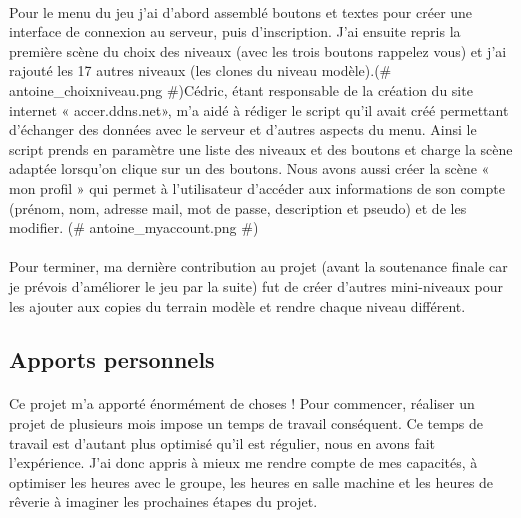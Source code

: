 \documentclass[titlepage, 13px, a4paper]{report}
\begin{document}
\paragraph{} \hspace{0pt} 
Pour le menu du jeu j'ai d'abord assemblé boutons et textes pour créer une
interface de connexion au serveur, puis d'inscription. J'ai ensuite repris la première
scène du choix des niveaux (avec les trois boutons rappelez vous) et j'ai rajouté
les 17 autres niveaux (les clones du niveau modèle).\@(\# antoine\_choixniveau.png \#)\@ Cédric, étant responsable de
la création du site internet « accer.ddns.net», m'a aidé à rédiger le script qu'il avait créé permettant 
d'échanger des données avec le serveur et d'autres aspects du menu. Ainsi le script prends
en paramètre une liste des niveaux et des boutons et charge la scène adaptée
lorsqu'on clique sur un des boutons. Nous avons aussi créer la scène « mon
profil » qui permet à l'utilisateur d'accéder aux informations de son compte
(prénom, nom, adresse mail, mot de passe, description et pseudo) et de les
modifier. \@(\# antoine\_myaccount.png \#)\@ \\


\paragraph{} \hspace{0pt} 
Pour terminer, ma dernière contribution au projet (avant la soutenance finale car je
prévois d'améliorer le jeu par la suite) fut de créer d'autres mini-niveaux pour les
ajouter aux copies du terrain modèle et rendre chaque niveau différent. \\


\subsection{Apports personnels}
\paragraph{} \hspace{0pt}
Ce projet m'a apporté énormément de choses ! Pour commencer, réaliser un projet
de plusieurs mois impose un temps de travail conséquent. Ce temps de travail est
d'autant plus optimisé qu'il est régulier, nous en avons fait l'expérience. J'ai donc
appris à mieux me rendre compte de mes capacités, à optimiser les heures avec le
groupe, les heures en salle machine et les heures de rêverie à imaginer les
prochaines étapes du projet. \\
\end{document}

